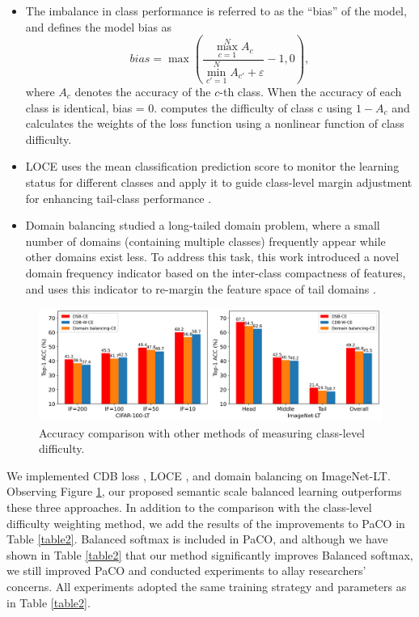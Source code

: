 \documentclass[10pt]{article} %
\begin{document}
\begin{itemize}
    \item The imbalance in class performance is referred to as the ``bias'' of the model, and \cite{paper27} defines the model bias as $$bias=\max(\frac{\max_{c=1}^NA_c}{\min_{c'=1}^NA_{c'}+\varepsilon}-1,0),$$ where $A_c$ denotes the accuracy of the $c$-th class. When the accuracy of each class is identical, bias = 0. \cite{paper27} computes the difficulty of class c using $1-A_c$ and calculates the weights of the loss function using a nonlinear function of class difficulty. 
    \item LOCE \cite{paper112} uses the mean classiﬁcation prediction score to monitor the learning status for different classes and apply it to guide class-level margin adjustment for enhancing tail-class performance \cite{paper2}. 
    \item Domain balancing \cite{paper111} studied a long-tailed domain problem, where a small number of domains (containing multiple classes) frequently appear while other domains exist less. To address this task, this work introduced a novel domain frequency indicator based on the inter-class compactness of features, and uses this indicator to re-margin the feature space of tail domains \cite{paper2}.
\end{itemize}

\begin{figure}[h] %
\begin{center}
\vskip -0.15in
\includegraphics[width=1\columnwidth]{fig22}
\vskip -0.1in
\caption{Accuracy comparison with other methods of measuring class-level difficulty.}
\label{fig22}
\end{center}
\vskip -0.05in
\end{figure}

We implemented CDB loss \cite{paper27}, LOCE \cite{paper112}, and domain balancing \cite{paper111} on ImageNet-LT. Observing Figure \ref{fig22}, our proposed semantic scale balanced learning outperforms these three approaches. In addition to the comparison with the class-level difficulty weighting method, we add the results of the improvements to PaCO \cite{paper73} in Table \ref{table2}. Balanced softmax is included in PaCO, and although we have shown in Table \ref{table2} that our method significantly improves Balanced softmax, we still improved PaCO and conducted experiments to allay researchers' concerns. All experiments adopted the same training strategy and parameters as in Table \ref{table2}.
\end{document}
